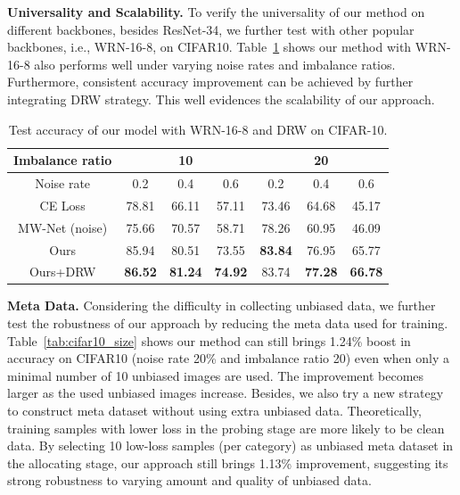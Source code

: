 \documentclass[letterpaper]{article} %
\newcommand{\bd}[1]{\textbf{#1}}
\begin{document}
\noindent
\bd{Universality and Scalability.}
To verify the universality of our method on different backbones, besides ResNet-34, we further test with other popular backbones, i.e., WRN-16-8, on CIFAR10.
Table~\ref{tab:cifar10_wrn} shows our method with WRN-16-8
also performs well under varying noise rates and imbalance ratios.
Furthermore, consistent accuracy improvement can be achieved by further integrating DRW strategy.
This well evidences the scalability of our approach.
\begin{table}[h]
\begin{center}
\begin{adjustbox}{max width=0.47\textwidth}
\begin{tabular}{c|c|c|c|c|c|c}
\hline
Imbalance ratio & \multicolumn{3}{c|}{10}    & \multicolumn{3}{c}{20} \\
\hline
Noise rate  & 0.2   & 0.4 & 0.6  & 0.2   & 0.4 & 0.6 \\
\hline
CE Loss & 78.81 & 66.11 & 57.11 & 73.46 & 64.68 & 45.17 \\
\hline
MW-Net (noise) & 75.66 & 70.57 & 58.71 &   78.26    & 60.95 & 46.09 \\
\hline
Ours  & 85.94 & 80.51 & 73.55 & \bd{83.84} & 76.95 & 65.77 \\
\hline
Ours+DRW & \bd{86.52} & \bd{81.24} & \bd{74.92} & 83.74 & \bd{77.28} & \bd{66.78} \\
\hline
\end{tabular}%
\end{adjustbox}
\caption{
Test accuracy of our model with  WRN-16-8 and DRW on CIFAR-10.
}
\label{tab:cifar10_wrn}
\end{center}
\end{table}

\noindent\bd{Meta Data.}
Considering the difficulty in collecting unbiased data, we further test the robustness of our approach by reducing the meta data used for training.
Table~\ref{tab:cifar10_size} shows our method can still brings 1.24\% boost in accuracy on CIFAR10 (noise rate 20\% and imbalance ratio 20) even when only a  minimal number of 10 unbiased images are used. The improvement becomes larger as the used unbiased images increase.
Besides, we also try a new strategy to construct meta dataset without using extra unbiased data.
Theoretically, training samples with lower loss in the probing stage are more likely to be clean data.
By selecting 10 low-loss samples (per category) as unbiased meta dataset in the allocating stage,
our approach still brings 1.13\% improvement,
suggesting its strong robustness to varying amount and quality of unbiased data.
\end{document}
